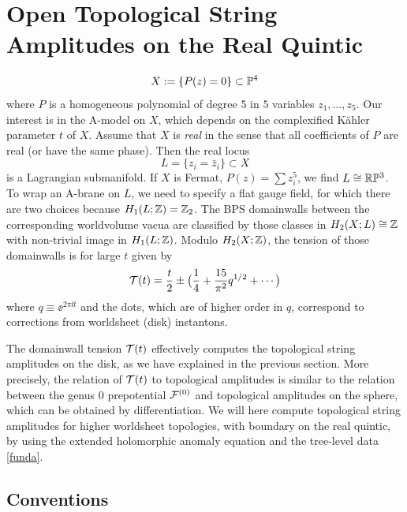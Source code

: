 \section{Open Topological String Amplitudes on the Real Quintic}

\begin{equation}
X := \{ P(z) = 0 \} \subset {\mathbb P}^4
\end{equation}
where $P$ is a homogeneous polynomial of degree $5$ in $5$ variables
$z_1,\ldots, z_5$. Our interest is in the A-model on $X$, which depends 
on the complexified K\"ahler parameter $t$ of $X$. Assume that $X$ is 
{\it real} in the sense that all coefficients of $P$ are real (or have 
the same phase). Then the real locus 
\begin{equation}
L = \{ z_i = \bar z_i \} \subset X
\end{equation}
is a Lagrangian submanifold. If $X$ is Fermat, $P(z) = \sum z_i^5$, 
we find $L\cong {\mathbb R}{\mathbb P}^3$. To wrap an A-brane on $L$, we
need to specify a flat gauge field, for which there are two choices
because $H_1(L;{\mathbb Z})={\mathbb Z}_2$. The BPS domainwalls between the
corresponding worldvolume vacua are classified by those classes in 
$H_2(X;L)\cong{\mathbb Z}$ with non-trivial image in $H_1(L;{\mathbb Z})$.
Modulo $H_2(X;{\mathbb Z})$, the tension of those domainwalls is for large 
$t$ given by \cite{open}
\begin{equation}
\eqlabel{funda}
\calt(t) = \frac t2 \pm \bigl(\frac 14 + \frac{15}{\pi^2} q^{1/2} + 
\cdots\bigr)
\end{equation}
where $q\equiv \ee^{2\pi\ii t}$ and the dots, which are of higher order 
in $q$, correspond to corrections from worldsheet (disk) instantons.

The domainwall tension ${\cal T}(t)$ effectively computes the topological 
string amplitudes on the disk, as we have explained in the previous
section. More precisely, the relation of ${\cal T}(t)$ to topological
amplitudes is similar to the relation between the genus $0$ prepotential
${{\cal F}}^{(0)}$ and topological amplitudes on the sphere, which can be obtained 
by differentiation. We will here compute topological string amplitudes 
for higher worldsheet topologies, with boundary on the real quintic,
by using the extended holomorphic anomaly equation and the tree-level 
data \eqref{funda}.


\subsection{Conventions}

